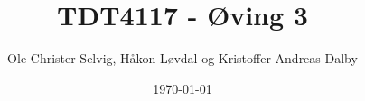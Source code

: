 \documentclass[a4paper, norsk, 10pt]{article}
\begin{document}
\title{TDT4117 - Øving 3}
\author{Ole Christer Selvig, Håkon Løvdal og Kristoffer Andreas Dalby}
\date{\today}
\maketitle
\thispagestyle{empty}

\pagebreak






\end{document}
